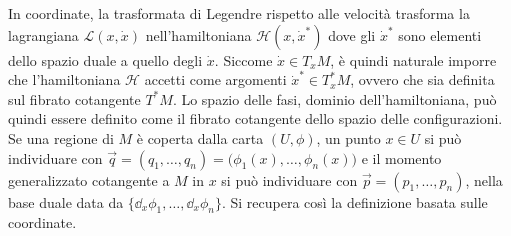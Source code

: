 In coordinate, la trasformata di Legendre rispetto alle velocità trasforma la lagrangiana $\mathcal{L}(x,\dot{x})$ nell'hamiltoniana $\mathcal{H}(x,\dot{x}^*)$ dove gli $\dot{x}^*$ sono elementi dello spazio duale a quello degli $\dot{x}$. Siccome $\dot{x} \in T_x M$, è quindi naturale imporre che l'hamiltoniana $\mathcal{H}$ accetti come argomenti $\dot{x}^* \in T_x^* M$, ovvero che sia definita sul fibrato cotangente $T^*M$. Lo spazio delle fasi, dominio dell'hamiltoniana, può quindi essere definito come il fibrato cotangente dello spazio delle configurazioni. Se una regione di $M$ è coperta dalla carta $(U,\phi)$, un punto $x \in U$ si può individuare con $\vec{q} = (q_1, \ldots, q_n) = \big(\phi_1(x), \ldots, \phi_n(x)\big)$ e il momento generalizzato cotangente a $M$ in $x$ si può individuare con $\vec{p}=(p_1, \ldots, p_n)$, nella base duale data da $\{\dd_x \phi_1, \ldots, \dd_x \phi_n\} $. Si recupera così la definizione basata sulle coordinate.


